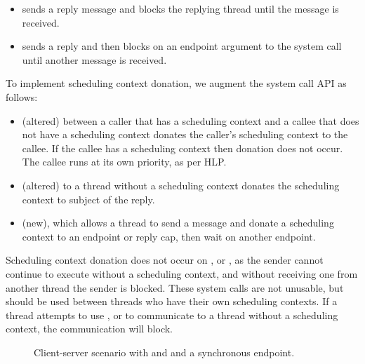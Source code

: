 \begin{itemize}
	\item \reply sends a reply message and blocks the replying thread until the message is received.
	\item \replywait sends a reply and then blocks on an endpoint argument to the system call until another message is received.
\end{itemize}

To implement scheduling context donation, we augment the system call API as follows:

\begin{itemize}
	\item \call (altered) between a caller that has a scheduling context and a callee that does not
        have a scheduling context donates the caller's scheduling context to the callee. If the callee has a scheduling context then donation does not occur. The callee runs at its own priority, as per \gls{HLP}.
	\item \replywait (altered) to a thread without a scheduling context donates the scheduling context to subject of the reply.
    \item \sendwait (new), which allows a thread to send a message and donate a scheduling context to an endpoint or reply cap, then wait on another endpoint.
\end{itemize}

Scheduling context donation does not occur on \send, \nbsend or \reply,  as the sender cannot continue to execute without a scheduling context, and without receiving one from another thread the sender is blocked.
These system calls are not unusable, but should be used between threads who have their own scheduling contexts.
If a thread attempts to use \send, \reply or \nbsend to communicate to a thread without a scheduling context, the communication will block.

\begin{figure}
\centering
\caption{Client-server scenario with \call and \replywait and a synchronous endpoint.}
\label{fig:client-server-endpoint}
\end{figure}

